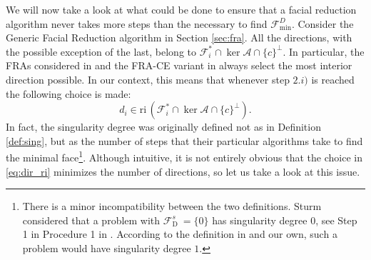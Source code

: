\documentclass{article}
\newcommand{\reInt}{\mathrm{ri}\,}
\newcommand{\feasS}{\mathcal{F}_{\text{D }}^s}
\newcommand{\minFaceD}{ {\mathcal{F}_{\min}^D}}
\newcommand{\stdMap}{ {\mathcal{A}}}
\newcommand{\stdFace}{ \mathcal{F}}
\begin{document}
 We will now take a  look at what could be done  to ensure that a facial reduction 
algorithm never takes more steps than the necessary to find $\minFaceD$. Consider the Generic Facial Reduction algorithm in Section \ref{sec:fra}. All the 
directions, with the possible exception of the last, belong to $\stdFace_i^*\cap \ker \stdMap \cap \{c\}^\perp$.
In particular, the FRAs considered in \cite{sturm_error_2000,sturm_handbook} and the FRA-CE variant in \cite{article_waki_muramatsu} always select the most interior direction 
possible. In our context, this means that whenever step $2.i)$ is reached the following choice is made:
\begin{equation}
d_i \in \reInt (\stdFace _i ^*\cap \ker \stdMap \cap \{c\}^\perp). \label{eq:dir_ri}
\end{equation}
In fact,  the singularity degree was originally  defined not as in Definition \ref{def:sing},
but as the number of steps that 
their particular algorithms take to find the minimal face\footnote{There is a minor incompatibility between the two definitions. Sturm considered that a problem with $\feasS = \{0\}$ has singularity degree $0$, see Step 1 in Procedure 1 in \cite{sturm_error_2000}. 
According to the 
definition in \cite{LP17} and our own, such a problem would have singularity degree $1$.}. Although intuitive, 
it is not entirely obvious that the choice in \eqref{eq:dir_ri} minimizes the number of directions,
so let us take a look at this issue.
\end{document}
